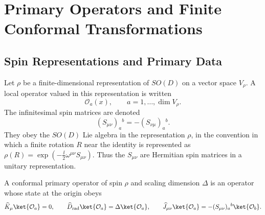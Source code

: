 \chapter{Primary Operators and Finite Conformal Transformations}
\label{ch:volume-iii-primary-operators-finite-transformations}
\ConventionsEuclideanCFT


\section{Spin Representations and Primary Data}

\begin{definition}
\label{def:spin-primary-datum}
Let \(\rho\) be a finite-dimensional representation of \(SO(D)\) on a vector
space \(V_\rho\).  A local operator valued in this representation is written
\[
  \mathcal O_a(x),
  \qquad
  a=1,\ldots,\dim V_\rho .
\]
The infinitesimal spin matrices are denoted
\[
  (S_{\mu\nu})_a{}^b=-(S_{\nu\mu})_a{}^b .
\]
They obey the \(SO(D)\) Lie algebra in the representation \(\rho\), in the
convention in which a finite rotation \(R\) near the identity is represented as
\(\rho(R)=\exp(-\frac{\ii}{2}\omega^{\mu\nu}S_{\mu\nu})\).  Thus the
\(S_{\mu\nu}\) are Hermitian spin matrices in a unitary representation.

A conformal primary operator of spin \(\rho\) and scaling dimension
\(\Delta\) is an operator whose state at the origin obeys
\begin{equation}
  \widehat K_\mu\ket{\mathcal O_a}=0,\qquad
  \widehat D_{\rm rad}\ket{\mathcal O_a}=\Delta\ket{\mathcal O_a},\qquad
  \widehat J_{\mu\nu}\ket{\mathcal O_a}
  =
  -(S_{\mu\nu})_a{}^b\ket{\mathcal O_b}.
  \label{eq:primary-state-data}
\end{equation}
\end{definition}

